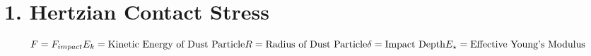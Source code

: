 \documentclass{article}
\begin{document}
\section{1. Hertzian Contact Stress}
\[
F = F_{impact}
\\E_k = \text{Kinetic Energy of Dust Particle}
\\R = \text{Radius of Dust Particle}
\delta = \text{Impact Depth}
E_\star = \text{Effective Young's Modulus}
\]
\end{document}
